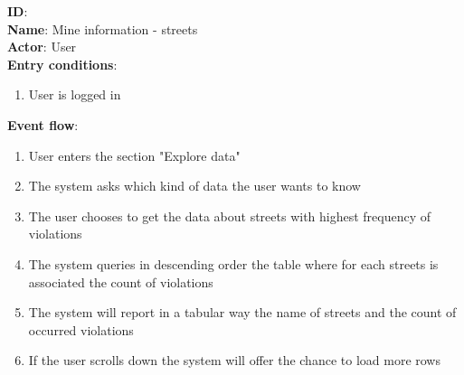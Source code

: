 \begin{enumerate}
\begin{itemize}
		\textbf{ID}:  \\
		\textbf{Name}: Mine information - streets \\
		\textbf{Actor}: User  \\
		\textbf{Entry conditions}:
		\begin{enumerate}
			\item{User is logged in}
		\end{enumerate}
		\textbf{Event flow}:
		\begin{enumerate}
			\item{User enters the section "Explore data"}
			\item{The system asks which kind of data the user wants to know}
      \item{The user chooses to get the data about streets with highest frequency of violations}
      \item{The system queries in descending order the table where for each streets is associated the count of violations }
      \item{The system will report in a tabular way the name of streets and the count of occurred violations}
      \item{If the user scrolls down the system will offer the chance to load more rows}
		\end{enumerate}


\end{itemize}
\end{enumerate}
